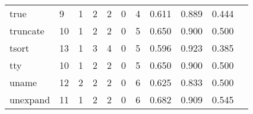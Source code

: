 \begin{longtable}{lp{1.2cm}p{1.2cm}p{1.2cm}p{1.2cm}p{1.2cm}p{1.2cm}p{1.2cm}p{1.2cm}p{1.2cm}p{1.2cm}}
true      &                                     9 &                                                  1 &                                                  2 &                                                  2 &                                                  0 &                                                  4 &                                         0.611 &                                              0.889 &                                              0.444 \\
truncate  &                                    10 &                                                  1 &                                                  2 &                                                  2 &                                                  0 &                                                  5 &                                         0.650 &                                              0.900 &                                              0.500 \\
tsort     &                                    13 &                                                  1 &                                                  3 &                                                  4 &                                                  0 &                                                  5 &                                         0.596 &                                              0.923 &                                              0.385 \\
tty       &                                    10 &                                                  1 &                                                  2 &                                                  2 &                                                  0 &                                                  5 &                                         0.650 &                                              0.900 &                                              0.500 \\
uname     &                                    12 &                                                  2 &                                                  2 &                                                  2 &                                                  0 &                                                  6 &                                         0.625 &                                              0.833 &                                              0.500 \\
unexpand  &                                    11 &                                                  1 &                                                  2 &                                                  2 &                                                  0 &                                                  6 &                                         0.682 &                                              0.909 &                                              0.545 \\

\end{longtable}
